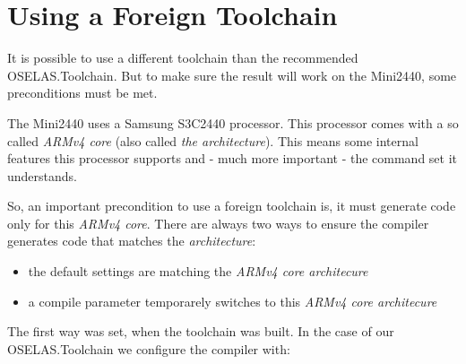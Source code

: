 %
%
%
%
%
%

\section{Using a Foreign Toolchain}		\label{sec:foreigntoolchain}

It is possible to use a different toolchain than the recommended OSELAS.Toolchain.
But to make sure the result will work on the Mini2440, some preconditions must
be met.

The Mini2440 uses a Samsung S3C2440 processor. This processor comes with a so
called \textit{ARMv4 core} (also called \textit{the architecture}). This means
some internal features this processor supports and - much more important - the
command set it understands.

So, an important precondition to use a foreign toolchain is, it must generate
code only for this \textit{ARMv4 core}. There are always two ways to ensure the
compiler generates code that matches the \textit{architecture}:

\begin{itemize}
	\item the default settings are matching the \textit{ARMv4 core architecure}
	\item a compile parameter temporarely switches to this \textit{ARMv4 core architecure}
\end{itemize}

The first way was set, when the toolchain was built. In the case of our
OSELAS.Toolchain we configure the compiler with:

